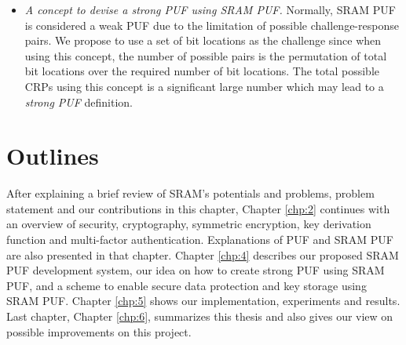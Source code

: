 \begin{itemize}
    \item \textit{A concept to devise a strong PUF using SRAM PUF.} Normally, SRAM PUF is considered a weak PUF due to the limitation of possible challenge-response pairs. We propose to use a set of bit locations as the challenge since when using this concept, the number of possible pairs is the permutation of total bit locations over the required number of bit locations. The total possible CRPs using this concept is a significant large number which may lead to a \textit{strong PUF} definition.
\end{itemize}


\section{Outlines}
After explaining a brief review of SRAM's potentials and problems, problem statement and our contributions in this chapter,
Chapter \ref{chp:2} continues with an overview of security, cryptography, symmetric encryption, key derivation function and multi-factor authentication. Explanations of PUF and SRAM PUF are also presented in that chapter. Chapter \ref{chp:4} describes our proposed SRAM PUF development system, our idea on how to create strong PUF using SRAM PUF, and a scheme to enable secure data protection and key storage using SRAM PUF. Chapter \ref{chp:5} shows our implementation, experiments and results. Last chapter, Chapter \ref{chp:6}, summarizes this thesis and also gives our view on possible improvements on this project.
